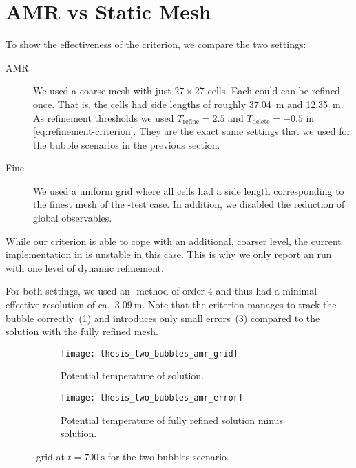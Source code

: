\section{AMR vs Static Mesh}\label{sec:results-tts-amr}
To show the effectiveness of the \amr{} criterion, we compare the two settings:
\begin{description}
\item[AMR] We used a coarse mesh with just $27 \times 27$ cells.
  Each could can be refined once.
  That is, the cells had side lengths of roughly \SI{37.04}{\m} and  \SI{12.35}{\m}.
  As refinement thresholds we used $T_\text{refine} = 2.5$ and $T_\text{delete} = -0.5$ in \cref{eq:refinement-criterion}.
  They are the exact same settings that we used for the bubble scenarios in the previous section.
\item[Fine] We used a uniform grid where all cells had a side length corresponding to the finest mesh of the \amr{}-test case.
  In addition, we disabled the reduction of global observables.
\end{description}
While our \amr{} criterion is able to cope with an additional, coarser level, the current implementation in \exahype{} is unstable in this case.
This is why we only report an \amr{} run with one level of dynamic refinement.

For both settings, we used an \aderdg{}-method of order $4$ and thus had a minimal effective resolution of ca.\ $\SI{3.09}{\m}$.
Note that the \amr{} criterion manages to track the bubble correctly~(\cref{fig:two-bubbles-amr-grid}) and introduces only small errors~(\cref{fig:two-bubbles-amr-error}) compared to the solution with the fully refined mesh.

\begin{figure}[htb]
\centering
\begin{subfigure}[t]{0.45\textwidth}
    \centering
    \texttt{[image: thesis\_two\_bubbles\_amr\_grid]} 
    \caption{\label{fig:two-bubbles-amr-grid}%
      Potential temperature of \amr{} solution.}
\end{subfigure}\qquad%
\begin{subfigure}[t]{0.45\textwidth}
    \centering
    \texttt{[image: thesis\_two\_bubbles\_amr\_error]} 
    \caption{\label{fig:two-bubbles-amr-error}%
      Potential temperature of fully refined solution minus \amr{} solution.}
\end{subfigure}

  \caption{%
    \amr{}-grid at $t = \SI{700}{\s}$ for the two bubbles scenario.}
\end{figure}

